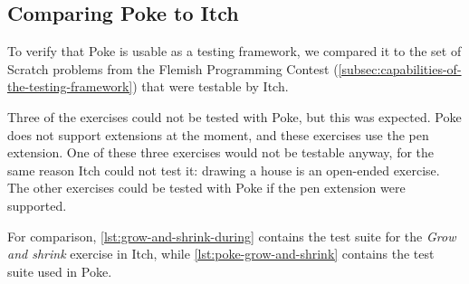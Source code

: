 \documentclass[../main]{subfiles}
\begin{document}
\subsection{Comparing Poke to Itch}\label{subsec:comparing-poke-to-itch}

To verify that Poke is usable as a testing framework, we compared it to the set of Scratch problems from the Flemish Programming Contest (\cref{subsec:capabilities-of-the-testing-framework}) that were testable by Itch.

Three of the exercises could not be tested with Poke, but this was expected.
Poke does not support extensions at the moment, and these exercises use the pen extension.
One of these three exercises would not be testable anyway, for the same reason Itch could not test it: drawing a house is an open-ended exercise.
The other exercises could be tested with Poke if the pen extension were supported.

For comparison, \cref{lst:grow-and-shrink-during} contains the test suite for the \emph{Grow and shrink} exercise in Itch, while \cref{lst:poke-grow-and-shrink} contains the test suite used in Poke.
\end{document}
